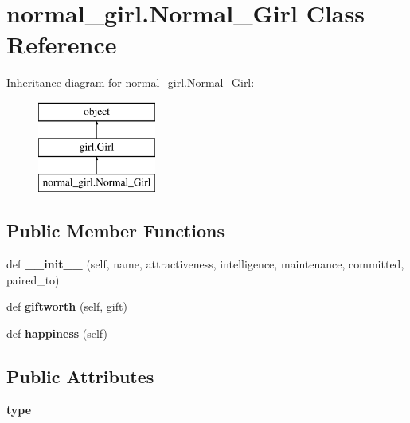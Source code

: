 \hypertarget{classnormal__girl_1_1_normal___girl}{}\section{normal\+\_\+girl.\+Normal\+\_\+\+Girl Class Reference}
\label{classnormal__girl_1_1_normal___girl}
Inheritance diagram for normal\+\_\+girl.\+Normal\+\_\+\+Girl\+:\begin{figure}[H]
\begin{center}
\leavevmode
\includegraphics[height=3.000000cm]{classnormal__girl_1_1_normal___girl}
\end{center}
\end{figure}
\subsection*{Public Member Functions}
\begin{DoxyCompactItemize}
\item 
\mbox{\label{classnormal__girl_1_1_normal___girl_a8fc16ab0acaf0997b8a4c5e0c2b57a0c}} 
def {\bfseries \+\_\+\+\_\+init\+\_\+\+\_\+} (self, name, attractiveness, intelligence, maintenance, committed, paired\+\_\+to)
\item 
\mbox{\label{classnormal__girl_1_1_normal___girl_ae7d0d26c0cfbf8152fba9113ff9ef763}} 
def {\bfseries giftworth} (self, gift)
\item 
\mbox{\label{classnormal__girl_1_1_normal___girl_a6508d58dab5d0c59d769f3f0c1325b46}} 
def {\bfseries happiness} (self)
\end{DoxyCompactItemize}
\subsection*{Public Attributes}
\begin{DoxyCompactItemize}
\item 
\mbox{\label{classnormal__girl_1_1_normal___girl_a2b09c350fa195f1532cff9689276e0a2}} 
{\bfseries type}
\end{DoxyCompactItemize}


